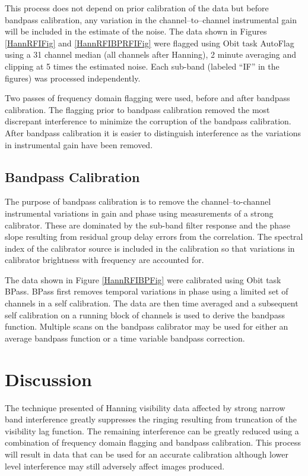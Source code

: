 \documentclass[journal]{IEEEtran}
\begin{document}
This process does not depend on prior calibration of the data but
before bandpass calibration, any variation in the channel--to--channel
instrumental gain will be included in the estimate of the noise.
The data shown in Figures \ref{HannRFIFig} and \ref{HannRFIBPRFIFig}
were flagged using Obit task AutoFlag using a 31 channel median (all
channels after Hanning), 2 minute averaging and clipping at 5 times the
estimated noise.
Each sub-band (labeled ``IF'' in the figures) was processed
independently. 

Two passes of frequency domain flagging were used, before and after
bandpass calibration.
The flagging prior to bandpass calibration removed the most discrepant
interference to minimize the corruption of the bandpass calibration.
After bandpass calibration it is easier to distinguish interference
as the variations in instrumental gain have been removed.

\subsection{Bandpass Calibration}
The purpose of bandpass calibration is to remove the
channel--to-channel instrumental variations in gain and phase using
measurements of a strong calibrator.
These are dominated by the sub-band filter response and the phase slope
resulting from residual group delay errors from the correlation.
The spectral index of the calibrator source is included in the
calibration so that variations in calibrator brightness with frequency
are accounted for.

The data shown in Figure \ref{HannRFIBPFig} were calibrated using Obit
task BPass.
BPass first removes temporal variations in phase using a limited set
of channels in a self calibration.
The data are then time averaged and a subsequent self calibration on a
running block of channels is used to derive the bandpass function.
Multiple scans on the bandpass calibrator may be used for either an
average bandpass function or a time variable bandpass correction.

\section{Discussion}
The technique presented of Hanning visibility data affected by strong
narrow band interference greatly suppresses the ringing resulting from
truncation of the visibility lag function.
The remaining interference can be greatly reduced using a combination
of frequency domain flagging and bandpass calibration.
This process will result in data that can be used for an accurate
calibration although lower level interference may still adversely
affect images produced.
\end{document}
